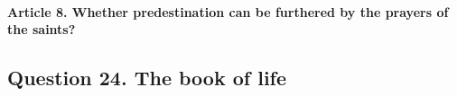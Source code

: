 \documentclass{ucetd}
\begin{document}
\paragraph{Article 8. Whether predestination can be furthered by the prayers of the saints?}
\subsection{Question 24. The book of life}
\end{document}
